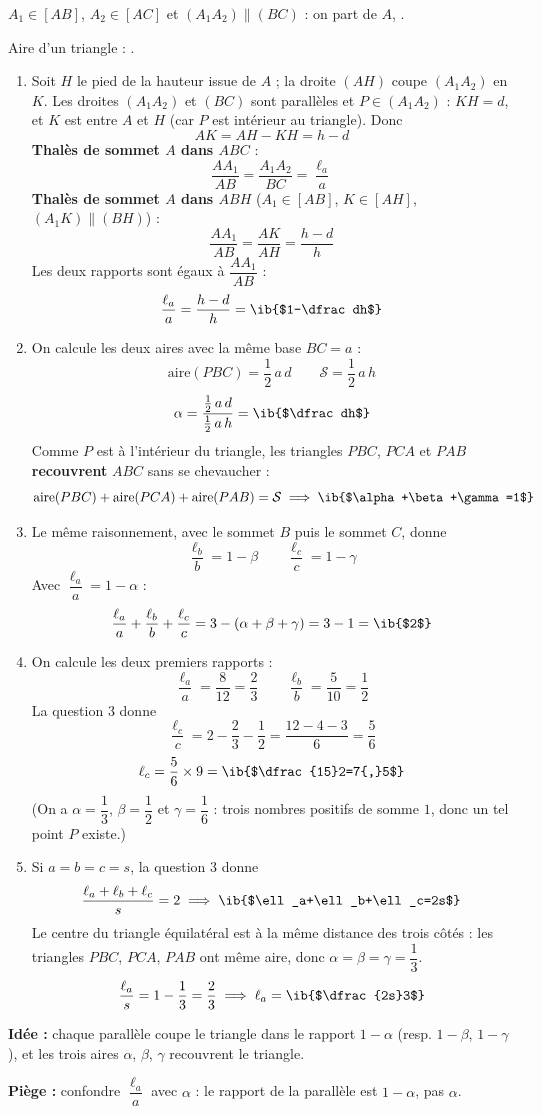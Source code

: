 \begin{prop}
$A_1\in[AB]$, $A_2\in[AC]$ et $(A_1A_2)\parallel(BC)$ : on part de $A$, .

Aire d'un triangle : .
\end{prop}
\begin{enumerate}
  \item Soit $H$ le pied de la hauteur issue de $A$ ; la droite $(AH)$ coupe $(A_1A_2)$ en $K$. Les droites $(A_1A_2)$ et $(BC)$ sont parallèles et $P\in(A_1A_2)$ : $KH=d$, et $K$ est entre $A$ et $H$ (car $P$ est intérieur au triangle). Donc
  \[AK=AH-KH=h-d\]
  \textbf{Thalès de sommet $A$ dans $ABC$} :
  \[\dfrac{AA_1}{AB}=\dfrac{A_1A_2}{BC}=\dfrac{\ell_a}a\]
  \textbf{Thalès de sommet $A$ dans $ABH$} ($A_1\in[AB]$, $K\in[AH]$, $(A_1K)\parallel(BH)$) :
  \[\dfrac{AA_1}{AB}=\dfrac{AK}{AH}=\dfrac{h-d}h\]
  Les deux rapports sont égaux à $\dfrac{AA_1}{AB}$ :
  \[\dfrac{\ell_a}a=\dfrac{h-d}h=\ib{$1-\dfrac dh$}\]

  \item On calcule les deux aires avec la même base $BC=a$ :
  \[\text{aire}(PBC)=\dfrac12\,a\,d\qquad\mathcal S=\dfrac12\,a\,h\]
  \[\alpha=\dfrac{\frac12\,a\,d}{\frac12\,a\,h}=\ib{$\dfrac dh$}\]
  Comme $P$ est à l'intérieur du triangle, les triangles $PBC$, $PCA$ et $PAB$ \textbf{recouvrent} $ABC$ sans se chevaucher :
  \[\text{aire}(PBC)+\text{aire}(PCA)+\text{aire}(PAB)=\mathcal S\implies\ib{$\alpha+\beta+\gamma=1$}\]

  \item Le même raisonnement, avec le sommet $B$ puis le sommet $C$, donne
  \[\dfrac{\ell_b}b=1-\beta\qquad\dfrac{\ell_c}c=1-\gamma\]
  Avec $\dfrac{\ell_a}a=1-\alpha$ :
  \[\dfrac{\ell_a}a+\dfrac{\ell_b}b+\dfrac{\ell_c}c=3-(\alpha+\beta+\gamma)=3-1=\ib{$2$}\]

  \item On calcule les deux premiers rapports :
  \[\dfrac{\ell_a}a=\dfrac8{12}=\dfrac23\qquad\dfrac{\ell_b}b=\dfrac5{10}=\dfrac12\]
  La question 3 donne
  \[\dfrac{\ell_c}c=2-\dfrac23-\dfrac12=\dfrac{12-4-3}6=\dfrac56\]
  \[\ell_c=\dfrac56\times9=\ib{$\dfrac{15}2=7{,}5$}\]
  (On a $\alpha=\dfrac13$, $\beta=\dfrac12$ et $\gamma=\dfrac16$ : trois nombres positifs de somme $1$, donc un tel point $P$ existe.)

  \item Si $a=b=c=s$, la question 3 donne
  \[\dfrac{\ell_a+\ell_b+\ell_c}s=2\implies\ib{$\ell_a+\ell_b+\ell_c=2s$}\]
  Le centre du triangle équilatéral est à la même distance des trois côtés : les triangles $PBC$, $PCA$, $PAB$ ont même aire, donc $\alpha=\beta=\gamma=\dfrac13$.
  \[\dfrac{\ell_a}s=1-\dfrac13=\dfrac23\implies\ell_a=\ib{$\dfrac{2s}3$}\]
\end{enumerate}
\textbf{Idée :} chaque parallèle coupe le triangle dans le rapport $1-\alpha$ (resp. $1-\beta$, $1-\gamma$), et les trois aires $\alpha$, $\beta$, $\gamma$ recouvrent le triangle.

\textbf{Piège :} confondre $\dfrac{\ell_a}a$ avec $\alpha$ : le rapport de la parallèle est $1-\alpha$, pas $\alpha$.
